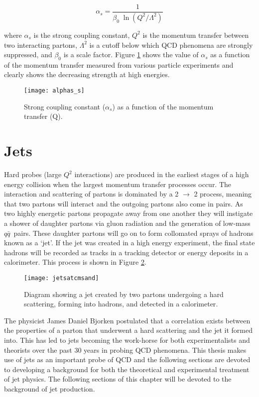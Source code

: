 \begin{equation}
\alpha_{s} = \frac{1}{\beta_{0} \; \ln(Q^{2}/\Lambda^{2} )}
\label{eq:alpha_s}
\end{equation}

\noindent
where $\alpha_{s}$ is the strong coupling constant, $Q^{2}$ is the momentum transfer between two interacting partons, $\Lambda^{2}$ is a cutoff below which QCD phenomena are strongly suppressed, and $\beta_{0}$ is a scale factor.  Figure \ref{fig:as} shows the value of $\alpha_{s}$ as a function of the momentum transfer measured from various particle experiments and clearly shows the decreasing strength at high energies.

\begin{figure}[h]
\texttt{[image: alphas\_s]}
\centering
\caption{Strong coupling constant ($\alpha_{s}$) as a function of the momentum transfer (Q)\cite{CMS:2014mna}.}
\label{fig:as}
\end{figure}

\section{Jets}

Hard probes (large $Q^{2}$ interactions) are produced in the earliest stages of a high energy collision when the largest momentum transfer processes occur.  The interaction and scattering of partons is dominated by a 2 $\rightarrow$ 2 process, meaning that two partons will interact and the outgoing partons also come in pairs.  As two highly energetic partons propagate away from one another they will instigate a shower of daughter partons via gluon radiation and the generation of low-mass $q \bar{q}$\, pairs.  These daughter partons will go on to form collomated sprays of hadrons known as a `jet'.  If the jet was created in a high energy experiment, the final state hadrons will be recorded as tracks in a tracking detector or energy deposits in a calorimeter.  This process is shown in Figure \ref{fig:MakeAJet}.



\begin{figure}[h]
\texttt{[image: jetsatcmsand]}
\centering
\caption{Diagram showing a jet created by two partons undergoing a hard scattering, forming into hadrons, and detected in a calorimeter\cite{JetPic}.}
\label{fig:MakeAJet}
\end{figure}

The physicist James Daniel Bjorken postulated that a correlation exists between the properties of a parton that underwent a hard scattering and the jet it formed into\cite{PhysRev.179.1547}\cite{Bjorken:1973kd}.  This has led to jets becoming the work-horse for both experimentalists and theorists over the past 30 years in probing QCD phenomena.  This thesis makes use of jets as an important probe of QCD and the following sections are devoted to developing a background for both the theoretical and experimental treatment of jet physics.  The following sections of this chapter will be devoted to the background of jet production.

